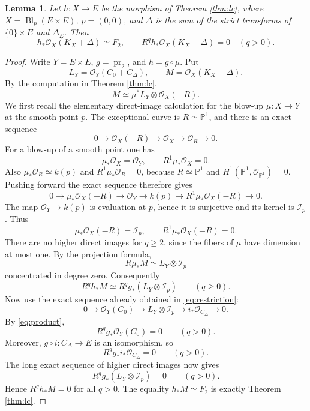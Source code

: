 \documentclass[10pt,a4paper]{amsart}
\newtheorem{lemma}[theorem]{Lemma}
\newcommand{\OO}{\mathcal O}
\newcommand{\II}{\mathcal I}
\newcommand{\PP}{\mathbb P}
\DeclareMathOperator{\pr}{pr}
\DeclareMathOperator{\Bl}{Bl}
\begin{document}
\begin{lemma}\label{lem:vanishing}
Let $h:X\to E$ be the morphism of Theorem \ref{thm:lc}, where $X=\Bl_p(E\times E)$, $p=(0,0)$, and $\Delta$ is the sum of the strict transforms of $\{0\}\times E$ and $\Delta_E$. Then
\[
h_*\OO_X(K_X+\Delta)\simeq F_2,\qquad R^qh_*\OO_X(K_X+\Delta)=0\quad(q>0).
\]
\end{lemma}
\begin{proof}
Write $Y=E\times E$, $g=\pr_2$, and $h=g\circ\mu$. Put
\[
L_Y=\OO_Y(C_0+C_\Delta),\qquad M=\OO_X(K_X+\Delta).
\]
By the computation in Theorem \ref{thm:lc},
\[
M\simeq\mu^*L_Y\otimes\OO_X(-R).
\]
We first recall the elementary direct-image calculation for the blow-up $\mu:X\to Y$ at the smooth point $p$. The exceptional curve is $R\simeq\PP^1$, and there is an exact sequence
\[
0\longrightarrow\OO_X(-R)\longrightarrow\OO_X\longrightarrow\OO_R\longrightarrow0.
\]
For a blow-up of a smooth point one has
\[
\mu_*\OO_X=\OO_Y,\qquad R^1\mu_*\OO_X=0.
\]
Also $\mu_*\OO_R\simeq k(p)$ and $R^1\mu_*\OO_R=0$, because $R\simeq\PP^1$ and $H^1(\PP^1,\OO_{\PP^1})=0$. Pushing forward the exact sequence therefore gives
\[
0\longrightarrow\mu_*\OO_X(-R)\longrightarrow\OO_Y\longrightarrow k(p)
\longrightarrow R^1\mu_*\OO_X(-R)\longrightarrow0.
\]
The map $\OO_Y\to k(p)$ is evaluation at $p$, hence it is surjective and its kernel is $\II_p$. Thus
\[
\mu_*\OO_X(-R)=\II_p,\qquad R^1\mu_*\OO_X(-R)=0.
\]
There are no higher direct images for $q\ge2$, since the fibers of $\mu$ have dimension at most one. By the projection formula,
\[
R\mu_*M\simeq L_Y\otimes\II_p
\]
concentrated in degree zero. Consequently
\[
R^qh_*M\simeq R^qg_*(L_Y\otimes\II_p)\qquad(q\ge0).
\]
Now use the exact sequence already obtained in \eqref{eq:restriction}:
\[
0\longrightarrow\OO_Y(C_0)\longrightarrow L_Y\otimes\II_p\longrightarrow i_*\OO_{C_\Delta}\longrightarrow0.
\]
By \eqref{eq:product},
\[
R^qg_*\OO_Y(C_0)=0\qquad(q>0).
\]
Moreover, $g\circ i:C_\Delta\to E$ is an isomorphism, so
\[
R^qg_*i_*\OO_{C_\Delta}=0\qquad(q>0).
\]
The long exact sequence of higher direct images now gives
\[
R^qg_*(L_Y\otimes\II_p)=0\qquad(q>0).
\]
Hence $R^qh_*M=0$ for all $q>0$. The equality $h_*M\simeq F_2$ is exactly Theorem \ref{thm:lc}.
\end{proof}
\end{document}
